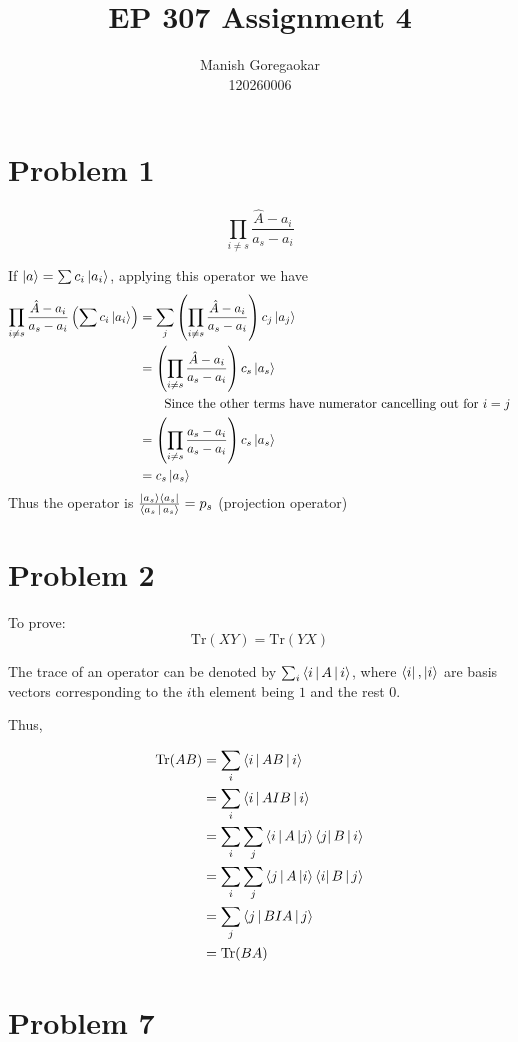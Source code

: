 \documentclass[12pt]{article}
\title{EP 307 Assignment 4}
\author{Manish Goregaokar\\120260006}
\begin{document}
\maketitle

\section*{Problem 1}
$$\prod_{i\neq s}\frac{\hat A-a_i}{a_s-a_i}$$

If $\Ket{a}=\sum c_i\Ket{a_i}$, applying this operator we have \begin{align*}
\prod_{i\neq s}\frac{\hat A-a_i}{a_s-a_i}\left(\sum c_i\Ket{a_i}\right)&=\sum_j\left(\prod_{i\neq s}\frac{\hat A-a_i}{a_s-a_i}\right)c_j\Ket{a_j}\\
&=\left(\prod_{i\neq s}\frac{\hat A-a_i}{a_s-a_i}\right)c_s\Ket{a_s}\\&\qquad\text{Since the other terms have numerator cancelling out for $i=j$}\\
&=\left(\prod_{i\neq s}\frac{a_s-a_i}{a_s-a_i}\right)c_s\Ket{a_s}\\
&=c_s\Ket{a_s}
\end{align*}
Thus the operator is $\frac{\Ket{a_s}\Bra{a_s}}{\Braket{a_s|a_s}}=p_s$ (projection operator)
\section*{Problem 2}
\newcommand{\Tr}{\mathrm{Tr}}
To prove:
$$\Tr(XY)=\Tr(YX)$$

The trace of an operator can be denoted by $\sum_i \Braket{i|A|i}$, where $\Bra{i},\Ket{i}$ are basis vectors corresponding to the $i$th element being $1$ and the rest $0$. 

Thus,

\begin{align*}
\Tr(AB) 
&= \sum_i \Braket{i|AB|i}\\
&= \sum_i  \Braket{i|AIB|i}\\
&= \sum_i\sum_j  \Braket{i|A\Ket{j}\Bra{j}B|i}\\
&= \sum_i\sum_j  \Braket{j|A\Ket{i}\Bra{i}B|j}\\
&= \sum_j  \Braket{j|BIA|j}\\
&= \Tr(BA)
\end{align*}

\section*{Problem 7}
\end{document}
